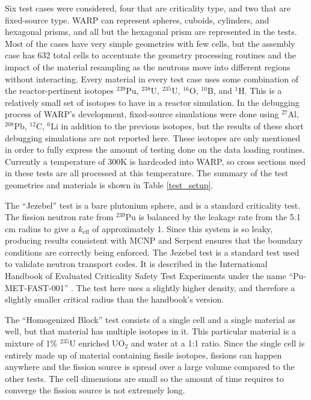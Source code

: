 Six test cases were considered, four that are criticality type, and two that are fixed-source type.  WARP can represent spheres, cuboids, cylinders, and hexagonal prisms, and all but the hexagonal prism are represented in the tests.  Most of the cases have very simple geometries with few cells, but the assembly case has 632 total cells to accentuate the geometry processing routines and the impact of the material resampling as the neutrons move into different regions without interacting.  Every material in every test case uses some combination of the reactor-pertinent isotopes $^{239}$Pu, $^{238}$U, $^{235}$U, $^{16}$O, $^{10}$B, and $^{1}$H.  This is a relatively small set of isotopes to have in a reactor simulation.  In the debugging process of WARP's development, fixed-source simulations were done using $^{27}$Al, $^{208}$Pb, $^{12}$C, $^{6}$Li in addition to the previous isotopes, but the results of these short debugging simulations are not reported here.  These isotopes are only mentioned in order to fully express the amount of testing done on the data loading routines. %
 Currently a temperature of 300K is hardcoded into WARP, so cross sections used in these tests are all processed at this temperature.   The summary of the test geometries and materials is shown in Table \ref{test_setup}.  

The ``Jezebel'' test is a bare plutonium sphere, and is a standard criticality test.   The fission neutron rate from $^{239}$Pu is balanced by the leakage rate from the 5.1 cm radius to give a $k_\mathrm{eff}$ of approximately 1.  Since this system is so leaky, producing results consistent with MCNP and Serpent ensures that the boundary conditions are correctly being enforced.  The Jezebel test is a standard test used to validate neutron transport codes.  It is described in the International Handbook of Evaluated Criticality Safety Test Experiments under the name ``Pu-MET-FAST-001'' \cite{bench_handbook}.  The test here uses a slightly higher density, and therefore a slightly smaller critical radius than the handbook's version.

The ``Homogenized Block'' test consists of a single cell and a single material as well, but that material has multiple isotopes in it.  This particular material is a mixture of 1\% $^{235}$U enriched UO$_2$ and water at a 1:1 ratio.  Since the single cell is entirely made up of material containing fissile isotopes, fissions can happen anywhere and the fission source is spread over a large volume compared to the other tests.  The cell dimensions are small so the amount of time requires to converge the fission source is not extremely long.

